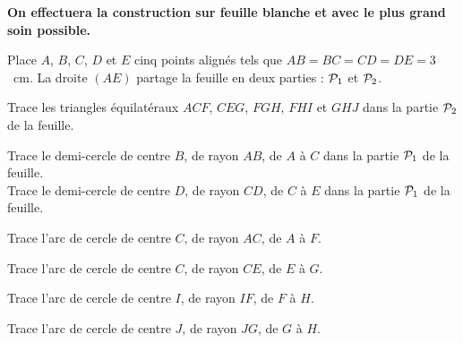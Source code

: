 {\bf On effectuera la construction sur feuille blanche et avec le plus
grand soin possible.}
\begin{myenumerate}
\item Place $A$, $B$, $C$, $D$ et $E$ cinq points alignés tels que
$AB=BC=CD=DE=3$~cm. La droite $(AE)$ partage la feuille en deux
parties : ${\cal P}_1$ et ${\cal P}_2$.
\item Trace les triangles équilatéraux $ACF$, $CEG$, $FGH$, $FHI$ et
$GHJ$ dans la partie ${\cal P}_2$ de la feuille.
\item Trace le demi-cercle de centre $B$, de rayon $AB$, de $A$ à $C$
dans la partie ${\cal P}_1$ de la feuille.\\Trace le demi-cercle de
centre $D$, de rayon $CD$, de $C$ à $E$ dans la partie ${\cal P}_1$ de
la feuille.
\item Trace l'arc de cercle de centre $C$, de rayon $AC$, de $A$ à $F$.
\item Trace l'arc de cercle de centre $C$, de rayon $CE$, de $E$ à $G$.
\item Trace l'arc de cercle de centre $I$, de rayon $IF$, de $F$ à $H$.
\item Trace l'arc de cercle de centre $J$, de rayon $JG$, de $G$ à $H$.
\end{myenumerate}